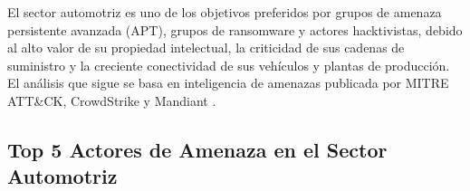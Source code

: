 \documentclass[letterpaper,11pt]{article}
\begin{document}
El sector automotriz es uno de los objetivos preferidos por grupos de amenaza persistente avanzada (APT), grupos de ransomware y actores hacktivistas, debido al alto valor de su propiedad intelectual, la criticidad de sus cadenas de suministro y la creciente conectividad de sus vehículos y plantas de producción. El análisis que sigue se basa en inteligencia de amenazas publicada por MITRE ATT\&CK, CrowdStrike y Mandiant \autocite{crowdstrike-report-2024, mitre-lazarus, mandiant-apt41-report}.

\subsection{Top 5 Actores de Amenaza en el Sector Automotriz}
\end{document}
